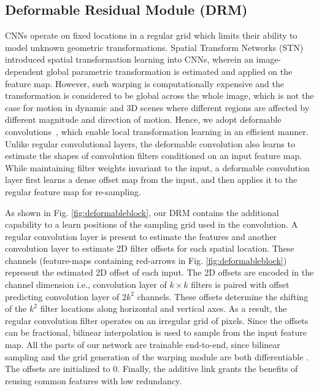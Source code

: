 \documentclass[10pt,twocolumn,letterpaper]{article}
\begin{document}
\subsection{Deformable Residual Module (DRM)}
CNNs operate on fixed locations in a regular grid which limits their ability to model unknown geometric transformations. Spatial Transform Networks (STN) \cite{jaderberg2015spatial} introduced spatial transformation learning into CNNs, wherein an image-dependent global parametric transformation is estimated and applied on the feature map. However, such warping is computationally expensive and the transformation is considered to be global across the whole image, which is not the case for motion in dynamic and 3D scenes where different regions are affected by different magnitude and direction of motion. Hence, we adopt deformable convolutions~\cite{dai2017deformable}, which enable local transformation learning in an efficient manner. Unlike regular convolutional layers, the deformable convolution\cite{dai2017deformable} also learns to estimate the shapes of convolution filters conditioned on an input feature map. While maintaining filter weights invariant to the input, a deformable convolution layer first learns a dense offset map from the input, and then applies it to the regular feature map for re-sampling.

As shown in Fig. \ref{fig:deformableblock}, our DRM contains the additional capability to a learn positions of the sampling grid used in the convolution. A regular convolution layer is present to estimate the features and another convolution layer to estimate 2D filter offsets for each spatial location. These channels (feature-maps containing red-arrows in Fig. \ref{fig:deformableblock}) represent the estimated 2D offset of each input. The 2D offsets are encoded in the channel dimension i.e., convolution layer of $k \times k$ filters is paired with offset predicting convolution layer of $2 k^2$ channels. These offsets determine the shifting of the $k^2$ filter locations along horizontal and vertical axes. As a result, the regular convolution filter operates on an irregular grid of pixels. Since the offsets can be fractional, bilinear interpolation is used to sample from the input feature map. All the parts of our network are trainable end-to-end, since bilinear sampling and the grid generation of the warping module are both differentiable \cite{paszke2017automatic}. The offsets are initialized to $0$. Finally, the additive link grants the benefits of reusing common features with low redundancy.
\end{document}
